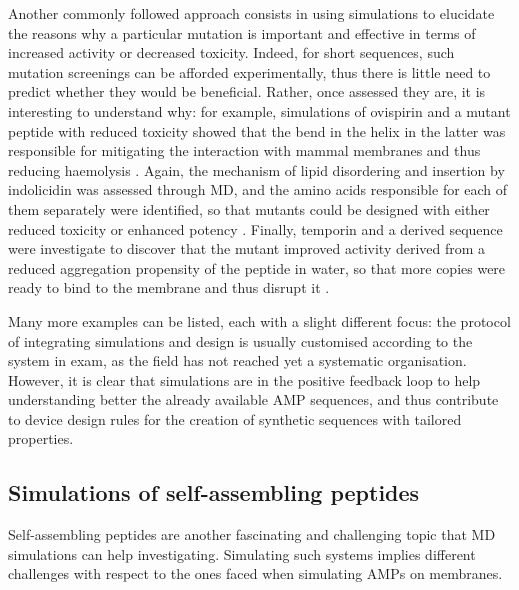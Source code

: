 Another commonly followed approach consists in using simulations to elucidate the reasons why a particular mutation is important and effective in terms of increased activity or decreased toxicity. Indeed, for short sequences, such mutation screenings can be afforded experimentally, thus there is little need to predict whether they would be beneficial. Rather, once assessed they are, it is interesting to understand why: for example, simulations of ovispirin and a mutant peptide with reduced toxicity showed that the bend in the helix in the latter was responsible for mitigating the interaction with mammal membranes and thus reducing haemolysis \cite{Khandelia2005}. Again, the mechanism of lipid disordering and insertion by indolicidin was assessed through MD, and the amino acids responsible for each of them separately were identified, so that mutants could be designed with either reduced toxicity or enhanced potency \cite{Tsai2009}. Finally, temporin and a derived sequence were investigate to discover that the mutant improved activity derived from a reduced aggregation propensity of the peptide in water, so that more copies were ready to bind to the membrane and thus disrupt it \cite{Farrotti2017}.

Many more examples can be listed, each with a slight different focus: the protocol of integrating simulations and design is usually customised according to the system in exam, as the field has not reached yet a systematic organisation.
%
However, it is clear that simulations are in the positive feedback loop to help understanding better the already available AMP sequences, and thus contribute to device design rules for the creation of synthetic sequences with tailored properties.


\subsection{Simulations of self-assembling peptides}
Self-assembling peptides are another fascinating and challenging topic that MD simulations can help investigating. Simulating such systems implies different challenges with respect to the ones faced when simulating AMPs on membranes.

